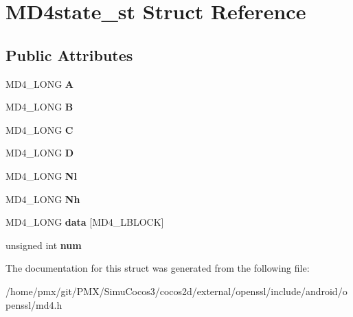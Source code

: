 \hypertarget{structMD4state__st}{}\section{M\+D4state\+\_\+st Struct Reference}
\label{structMD4state__st}
\subsection*{Public Attributes}
\begin{DoxyCompactItemize}
\item 
\mbox{\label{structMD4state__st_a9573434688a6578764e83cf2c3ea5d20}} 
M\+D4\+\_\+\+L\+O\+NG {\bfseries A}
\item 
\mbox{\label{structMD4state__st_aa04cb7f782726f8ab6d9e78fc4b93f63}} 
M\+D4\+\_\+\+L\+O\+NG {\bfseries B}
\item 
\mbox{\label{structMD4state__st_a9397abcee77c8bdfdbb2d47fc448e486}} 
M\+D4\+\_\+\+L\+O\+NG {\bfseries C}
\item 
\mbox{\label{structMD4state__st_ac918583b54dc234e97953a32ac0ae97f}} 
M\+D4\+\_\+\+L\+O\+NG {\bfseries D}
\item 
\mbox{\label{structMD4state__st_a7f97311bae9341a6566991805a529f38}} 
M\+D4\+\_\+\+L\+O\+NG {\bfseries Nl}
\item 
\mbox{\label{structMD4state__st_a8a0b1c520fc5b0eaeb310263694a46f8}} 
M\+D4\+\_\+\+L\+O\+NG {\bfseries Nh}
\item 
\mbox{\label{structMD4state__st_ad55f4d09194c1d881b2ae597603ae5a6}} 
M\+D4\+\_\+\+L\+O\+NG {\bfseries data} \mbox{[}M\+D4\+\_\+\+L\+B\+L\+O\+CK\mbox{]}
\item 
\mbox{\label{structMD4state__st_ae7e35fdee3a693c34c4322b00e9a9541}} 
unsigned int {\bfseries num}
\end{DoxyCompactItemize}


The documentation for this struct was generated from the following file\+:\begin{DoxyCompactItemize}
\item 
/home/pmx/git/\+P\+M\+X/\+Simu\+Cocos3/cocos2d/external/openssl/include/android/openssl/md4.\+h\end{DoxyCompactItemize}
